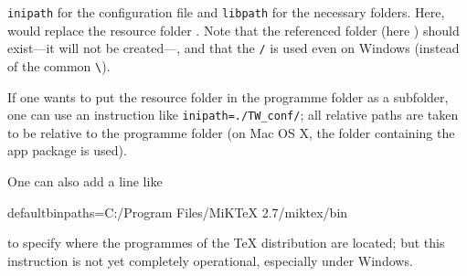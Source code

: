 \verb+inipath+ for the configuration file and \verb+libpath+ for the necessary folders. Here,  would replace the resource folder . Note that the referenced folder (here ) should exist---it will not be created---, and that the \verb|/| is used even on Windows (instead of the common \verb+\+).

If one wants to put the resource folder in the programme folder as a subfolder, one can use an instruction like \verb+inipath=./TW_conf/+; all relative paths are taken to be relative to the {\Tw} programme folder (on Mac OS X, the folder containing the app package is used).

One can also add a line like
\begin{verbExample}
defaultbinpaths=C:/Program Files/MiKTeX 2.7/miktex/bin
\end{verbExample}
to specify where the programmes of the {\TeX} distribution are located; but this instruction is not yet completely operational, especially under Windows.
